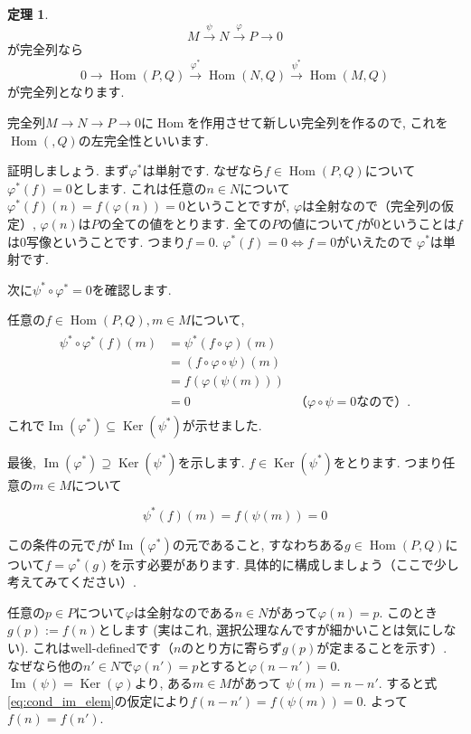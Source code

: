 \documentclass{jsarticle}
\newcommand{\makeop}[1]{\mathop{\mathrm{#1}}\nolimits}
\def\Im{\makeop{Im}}
\def\Ker{\makeop{Ker}}
\def\Hom{\makeop{Hom}}
\theoremstyle{definition}
\newtheorem{theorem}{定理}
\numberwithin{theorem}{section}
\begin{document}
\begin{theorem}
\[
M \xrightarrow{\displaystyle\psi} N \xrightarrow{\displaystyle\varphi} P\rightarrow 0
\]
が完全列なら
\[
0 \rightarrow \Hom(P, Q) \xrightarrow{\varphi^*} \Hom(N, Q) \xrightarrow{\psi^*} \Hom(M, Q)
\]
が完全列となります.
\end{theorem}
完全列$M\rightarrow N \rightarrow P \rightarrow 0$に$\Hom$を作用させて新しい完全列を作るので,
これを$\Hom(, Q)$の左完全性といいます.

証明しましょう. まず$\varphi^*$は単射です. なぜなら$f \in \Hom(P, Q)$について$\varphi^*(f) = 0$とします. これは任意の$n\in N$について
$\varphi^*(f)(n) = f(\varphi(n)) = 0$ということですが, $\varphi$は全射なので（完全列の仮定）, $\varphi(n)$は$P$の全ての値をとります.
全ての$P$の値について$f$が0ということは$f$は0写像ということです. つまり$f=0$. $\varphi^*(f) = 0 \Leftrightarrow f = 0$がいえたので
$\varphi^*$は単射です.

次に$\psi^*\circ\varphi^* = 0$を確認します.

任意の$f\in\Hom(P, Q), m \in M$について,
\begin{eqnarray*}
\begin{aligned}
\psi^*\circ\varphi^*(f)(m) &= \psi^*(f\circ\varphi)(m)\\
&= (f\circ\varphi\circ\psi)(m)\\
&= f(\varphi(\psi(m)))\\
&= 0 & （\varphi\circ\psi = 0なので）.
\end{aligned}
\end{eqnarray*}
これで$\Im(\varphi^*)\subseteq\Ker(\psi^*)$が示せました.

最後, $\Im(\varphi^*)\supseteq \Ker(\psi^*)$を示します. $f\in\Ker(\psi^*)$をとります. つまり任意の$m\in M$について

\begin{equation}
\label{eq:cond_im_elem}
\psi^*(f)(m) = f(\psi(m)) = 0
\end{equation}

この条件の元で$f$が$\Im(\varphi^*)$の元であること, すなわちある$g\in\Hom(P, Q)$について$f = \varphi^*(g)$を示す必要があります. 具体的に構成しましょう（ここで少し考えてみてください）.

任意の$p\in P$について$\varphi$は全射なのである$n\in N$があって$\varphi(n) = p$. このとき$g(p) := f(n)$とします
(実はこれ, 選択公理なんですが細かいことは気にしない). これはwell-definedです（$n$のとり方に寄らず$g(p)$が定まることを示す）.
なぜなら他の$n'\in N$で$\varphi(n') = p$とすると$\varphi(n-n') = 0$. $\Im(\psi) = \Ker(\varphi)$より, ある$m\in M$があって
$\psi(m) = n-n'$. すると式\ref{eq:cond_im_elem}の仮定により$f(n-n') = f(\psi(m)) = 0$. よって$f(n) = f(n')$.
\end{document}
